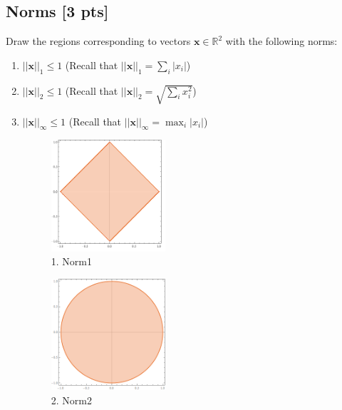 \documentclass[a4paper]{article}
\theoremstyle{definition}
\newcommand{\RR}{\mathbb{R}}
\newenvironment{soln}{
    \leavevmode\color{blue}\ignorespaces
}{}
\begin{document}
\subsection{Norms [3 pts]}
Draw the regions corresponding to vectors $\mathbf{x}\in\RR^2$ with the following norms:
\begin{enumerate}
	\item 	$||\mathbf{x}||_1\leq 1$ (Recall that $||\mathbf{x}||_1 = \sum_i |x_i|$)
	\item 	$||\mathbf{x}||_2 \leq 1$ (Recall that $||\mathbf{x}||_2 =\sqrt{\sum_i x_i^2}$)
	\item 	$||\mathbf{x}||_\infty \leq 1$ (Recall that $||\mathbf{x}||_\infty = \max_i |x_i|$)
	
	\begin{soln}
	    \begin{figure}[h!]
	        \centering
	        \includegraphics[width=0.4\textwidth]{Norm1.png} 
	        \captionsetup{labelformat=empty}
	        \caption{1. Norm1}
	        \label{fig:Norm1}
	    \end{figure}

		\begin{figure}[h!]
	        \centering
	        \includegraphics[width=0.4\textwidth]{Norm2.png} 
	        \captionsetup{labelformat=empty}
	        \caption{2. Norm2}
	        \label{fig:Norm2}
	        \end{figure}
	

\end{soln}
\end{enumerate}
\end{document}
